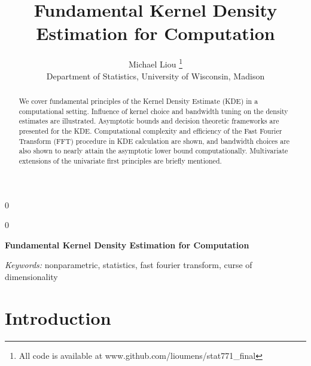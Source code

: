 \documentclass[12pt]{article}
\newcommand{\blind}{0}
\begin{document}
\def\spacingset#1{\renewcommand{\baselinestretch}%
{#1}\small\normalsize} \spacingset{1}



\blind
{
  \title{\bf Fundamental Kernel Density Estimation for Computation}

  \author{
        Michael Liou \thanks{All code is available at www.github.com/lioumens/stat771\_final} \\
    Department of Statistics, University of Wisconsin, Madison\\
      }
  \maketitle
} \fi

\blind
{
  \bigskip
  \bigskip
  \bigskip
  \begin{center}
    {\LARGE\bf Fundamental Kernel Density Estimation for Computation}
  \end{center}
  \medskip
} \fi

\bigskip
\begin{abstract}
We cover fundamental principles of the Kernel Density Estimate (KDE) in
a computational setting. Influence of kernel choice and bandwidth tuning
on the density estimates are illustrated. Asymptotic bounds and decision
theoretic frameworks are presented for the KDE. Computational complexity
and efficiency of the Fast Fourier Transform (FFT) procedure in KDE
calculation are shown, and bandwidth choices are also shown to nearly
attain the asymptotic lower bound computationally. Multivariate
extensions of the univariate first principles are briefly mentioned.
\end{abstract}

\noindent%
{\it Keywords:} nonparametric, statistics, fast fourier transform, curse of dimensionality
\vfill

\newpage
\spacingset{1.45} %

\newcommand{\expect}[1]{\mathbf{E}\left[ #1 \right]}
\newcommand{\variance}[1]{\mathrm{Var}\left( #1 \right)}
\newcommand{\covariance}[1]{\mathrm{Cov}\left( #1 \right)}
\newcommand{\bigo}[1]{\mathcal{O}\left( #1 \right)}

\def\tightlist{}

\section{Introduction}\label{introduction}
\end{document}
